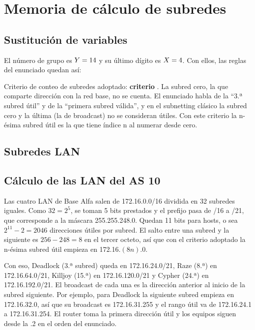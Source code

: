 \section{Memoria de cálculo de subredes}


\subsection{Sustitución de variables}

El número de grupo es $Y=14$ y su último dígito es $X=4$. Con ellos, las reglas del enunciado quedan así:

\begin{center}

\end{center}

Criterio de conteo de subredes adoptado: \textbf{criterio \CriterioSubredes}. La subred cero, la que comparte dirección con la red base, no se cuenta. El enunciado habla de la ``3.ª subred útil'' y de la ``primera subred válida'', y en el subnetting clásico la subred cero y la última (la de broadcast) no se consideran útiles. Con este criterio la n-ésima subred útil es la que tiene índice n al numerar desde cero.

\subsection{Subredes LAN}

{\footnotesize\setlength{\tabcolsep}{3pt}

}

\subsection{Cálculo de las LAN del AS 10}

Las cuatro LAN de Base Alfa salen de 172.16.0.0/16 dividida en 32 subredes iguales. Como $32 = 2^5$, se toman 5 bits prestados y el prefijo pasa de /16 a /21, que corresponde a la máscara 255.255.248.0. Quedan 11 bits para hosts, o sea $2^{11} - 2 = 2046$ direcciones útiles por subred. El salto entre una subred y la siguiente es $256 - 248 = 8$ en el tercer octeto, así que con el criterio adoptado la n-ésima subred útil empieza en 172.16.$(8n)$.0.

Con eso, Deadlock (3.ª subred) queda en 172.16.24.0/21, Raze (8.ª) en 172.16.64.0/21, Killjoy (15.ª) en 172.16.120.0/21 y Cypher (24.ª) en 172.16.192.0/21. El broadcast de cada una es la dirección anterior al inicio de la subred siguiente. Por ejemplo, para Deadlock la siguiente subred empieza en 172.16.32.0, así que su broadcast es 172.16.31.255 y el rango útil va de 172.16.24.1 a 172.16.31.254. El router toma la primera dirección útil y los equipos siguen desde la .2 en el orden del enunciado.

